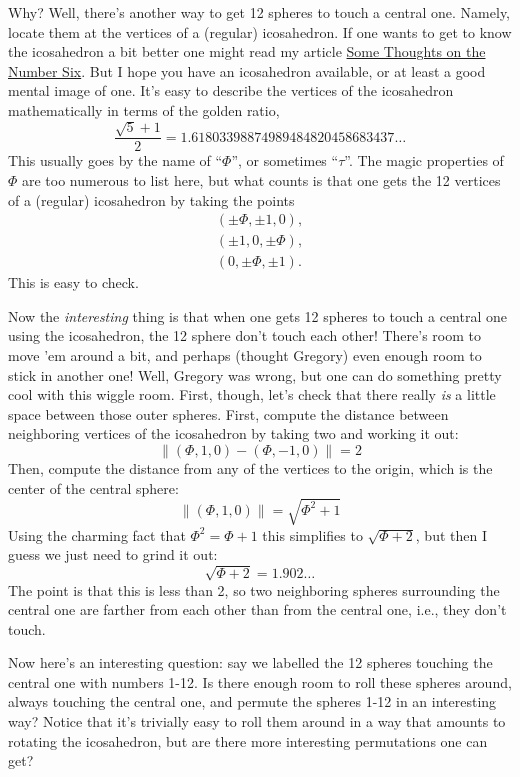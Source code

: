 \documentclass[12pt]{article}
\begin{document}
Why? Well, there's another way to get 12 spheres to touch a central one.
Namely, locate them at the vertices of a (regular) icosahedron. If one
wants to get to know the icosahedron a bit better one might read my
article \href{http://math.ucr.edu/home/baez/six.html}{Some Thoughts on
the Number Six}. But I hope you have an icosahedron available, or at
least a good mental image of one. It's easy to describe the vertices of
the icosahedron mathematically in terms of the golden ratio,
\[\frac{\sqrt{5} + 1}{2} = 1.61803398874989484820458683437\ldots\] This
usually goes by the name of ``\(\Phi\)'', or sometimes ``\(\tau\)''. The magic properties
of \(\Phi\) are too numerous to list here, but what counts is that one gets
the 12 vertices of a (regular) icosahedron by taking the points \[
  \begin{gathered}
    (\pm \Phi, \pm1, 0),
  \\(\pm1, 0, \pm \Phi),
  \\(0, \pm \Phi, \pm1).
  \end{gathered}
\] This is easy to check.

Now the \emph{interesting} thing is that when one gets 12 spheres to
touch a central one using the icosahedron, the 12 sphere don't touch
each other! There's room to move 'em around a bit, and perhaps (thought
Gregory) even enough room to stick in another one! Well, Gregory was
wrong, but one can do something pretty cool with this wiggle room.
First, though, let's check that there really \emph{is} a little space
between those outer spheres. First, compute the distance between
neighboring vertices of the icosahedron by taking two and working it
out: 
\[\|(\Phi,1,0) -(\Phi,-1,0)\| = 2\] 
Then, compute the distance from any
of the vertices to the origin, which is the center of the central
sphere: 
\[\|(\Phi,1,0)\| = \sqrt{\Phi^2 + 1}\] 
Using the charming fact that
\(\Phi^2 = \Phi + 1\) this simplifies to \(\sqrt{\Phi + 2}\), but then I guess we
just need to grind it out: 
\[\sqrt{\Phi + 2} =  1.902\ldots\] 
The point is
that this is less than 2, so two neighboring spheres surrounding the
central one are farther from each other than from the central one, i.e.,
they don't touch.

Now here's an interesting question: say we labelled the 12 spheres
touching the central one with numbers 1-12. Is there enough room to roll
these spheres around, always touching the central one, and permute the
spheres 1-12 in an interesting way? Notice that it's trivially easy to
roll them around in a way that amounts to rotating the icosahedron, but
are there more interesting permutations one can get?
\end{document}
